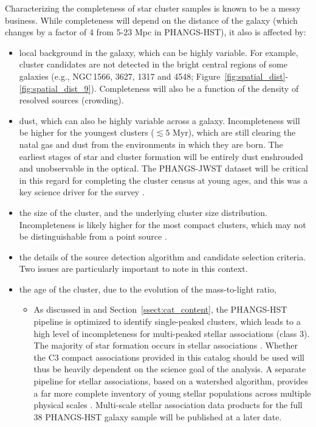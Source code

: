 \documentclass[linenumbers]{aastex63}
\begin{document}
Characterizing the completeness of star cluster samples is known to be a messy business. While completeness will depend on the distance of the galaxy (which changes by a factor of 4 from 5-23 Mpc in PHANGS-HST), it also is affected by:
\begin{itemize}
    \item local background in the galaxy, which can be highly variable.  For example, cluster candidates are not detected in the bright central regions of some galaxies (e.g., NGC\,1566, 3627, 1317 and 4548; Figure~\ref{fig:spatial_dist}-\ref{fig:spatial_dist_9}). Completeness will also be a function of the density of resolved sources (crowding).
    \item dust, which can also be highly variable across a galaxy.  Incompleteness will be higher for the youngest clusters ($\lesssim5$ Myr), which are still clearing the natal gas and dust from the environments in which they are born.  The earliest stages of star and cluster formation will be entirely dust enshrouded and unobservable in the optical.   The PHANGS-JWST dataset will be critical in this regard for completing the cluster census at young ages, and this was a key science driver for the survey \citep[][and references therein]{lee_phangs-jwst_2023}.
    \item the size of the cluster, and the underlying cluster size distribution.  Incompleteness is likely higher for the most compact clusters, which may not be distinguishable from a point source \citep[e.g.,][]{ryon_effective_2017, brown_radii_2021}.  
    \item the details of the source detection algorithm and candidate selection criteria.  Two issues are particularly important to note in this context.
    \item the age of the cluster, due to the evolution of the mass-to-light ratio,
    \begin{itemize}
    \item As discussed in \citet{lee_phangs-hst_2022} and Section~\ref{ssect:cat_content}, the PHANGS-HST pipeline is optimized to identify single-peaked clusters, which leads to a high level of incompleteness for multi-peaked stellar associations (class 3).  The majority of star formation occurs in stellar associations \citep[][and references therein]{lada03,ward18, ward20, wright20}.  Whether the C3 compact associations provided in this catalog should be used will thus be heavily dependent on the science goal of the analysis. A separate pipeline for stellar associations, based on a watershed algorithm, provides a far more complete inventory of young stellar populations across multiple physical scales \citep{larson_multiscale_2023}. Multi-scale stellar association data products for the full 38 PHANGS-HST galaxy sample will be published at a later date.  

\end{itemize}
\end{itemize}
\end{document}
